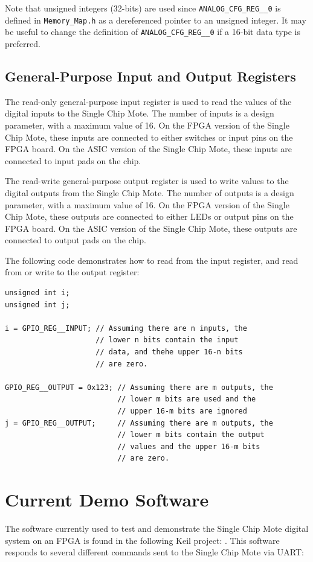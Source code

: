 Note that unsigned integers (32-bits) are used since \texttt{ANALOG\_CFG\_REG\_\_0} is defined in \texttt{Memory\_Map.h} as a dereferenced pointer to an unsigned integer. It may be useful to change the definition of \texttt{ANALOG\_CFG\_REG\_\_0} if a 16-bit data type is preferred.

\subsection{General-Purpose Input and Output Registers}
The read-only general-purpose input register is used to read the values of the digital inputs to the Single Chip Mote. The number of inputs is a design parameter, with a maximum value of 16. On the FPGA version of the Single Chip Mote, these inputs are connected to either switches or input pins on the FPGA board. On the ASIC version of the Single Chip Mote, these inputs are connected to input pads on the chip.

The read-write general-purpose output register is used to write values to the digital outputs from the Single Chip Mote. The number of outputs is a design parameter, with a maximum value of 16. On the FPGA version of the Single Chip Mote, these outputs are connected to either LEDs or output pins on the FPGA board. On the ASIC version of the Single Chip Mote, these outputs are connected to output pads on the chip.

The following code demonstrates how to read from the input register, and read from or write to the output register:

\begin{lstlisting}
unsigned int i;
unsigned int j;

i = GPIO_REG__INPUT; // Assuming there are n inputs, the
                     // lower n bits contain the input
                     // data, and thehe upper 16-n bits
                     // are zero.

GPIO_REG__OUTPUT = 0x123; // Assuming there are m outputs, the
                          // lower m bits are used and the
                          // upper 16-m bits are ignored
j = GPIO_REG__OUTPUT;     // Assuming there are m outputs, the
                          // lower m bits contain the output
                          // values and the upper 16-m bits
                          // are zero.
\end{lstlisting}

\section{Current Demo Software}
The software currently used to test and demonstrate the Single Chip Mote digital system on an FPGA is found in the following Keil project: . This software responds to several different commands sent to the Single Chip Mote via UART:

